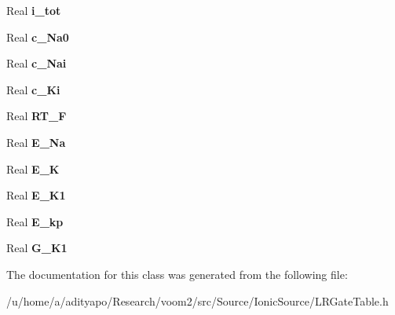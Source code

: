 \begin{DoxyCompactItemize}
\item 
\hypertarget{class_luo_rudy_gate_table_a251d6e727bba7657ac596c48cdac5ac0}{
Real {\bfseries i\_\-tot}}
\label{class_luo_rudy_gate_table_a251d6e727bba7657ac596c48cdac5ac0}

\item 
\hypertarget{class_luo_rudy_gate_table_a746142ec4c204d1a2fcd98ca1a7e570c}{
Real {\bfseries c\_\-Na0}}
\label{class_luo_rudy_gate_table_a746142ec4c204d1a2fcd98ca1a7e570c}

\item 
\hypertarget{class_luo_rudy_gate_table_a6554584f67e796b5100a671c1bcfb9ae}{
Real {\bfseries c\_\-Nai}}
\label{class_luo_rudy_gate_table_a6554584f67e796b5100a671c1bcfb9ae}

\item 
\hypertarget{class_luo_rudy_gate_table_a196360d980f5188b542e2b8ebeb70a0e}{
Real {\bfseries c\_\-Ki}}
\label{class_luo_rudy_gate_table_a196360d980f5188b542e2b8ebeb70a0e}

\item 
\hypertarget{class_luo_rudy_gate_table_a13239521e5056c1fd560c657eecb57e4}{
Real {\bfseries RT\_\-F}}
\label{class_luo_rudy_gate_table_a13239521e5056c1fd560c657eecb57e4}

\item 
\hypertarget{class_luo_rudy_gate_table_a18449666ba0bd4490fda2c5c79122bfd}{
Real {\bfseries E\_\-Na}}
\label{class_luo_rudy_gate_table_a18449666ba0bd4490fda2c5c79122bfd}

\item 
\hypertarget{class_luo_rudy_gate_table_a32cf328029420b482fd6fae9eeae660d}{
Real {\bfseries E\_\-K}}
\label{class_luo_rudy_gate_table_a32cf328029420b482fd6fae9eeae660d}

\item 
\hypertarget{class_luo_rudy_gate_table_a37897a0fae6854f3656c1b16f073b001}{
Real {\bfseries E\_\-K1}}
\label{class_luo_rudy_gate_table_a37897a0fae6854f3656c1b16f073b001}

\item 
\hypertarget{class_luo_rudy_gate_table_aa4bdeffdd714f090b8f99bb7ccf3dd27}{
Real {\bfseries E\_\-kp}}
\label{class_luo_rudy_gate_table_aa4bdeffdd714f090b8f99bb7ccf3dd27}

\item 
\hypertarget{class_luo_rudy_gate_table_ad477af94a9c0bb451123c86d7a1b6c0f}{
Real {\bfseries G\_\-K1}}
\label{class_luo_rudy_gate_table_ad477af94a9c0bb451123c86d7a1b6c0f}

\end{DoxyCompactItemize}


The documentation for this class was generated from the following file:\begin{DoxyCompactItemize}
\item 
/u/home/a/adityapo/Research/voom2/src/Source/IonicSource/LRGateTable.h\end{DoxyCompactItemize}
